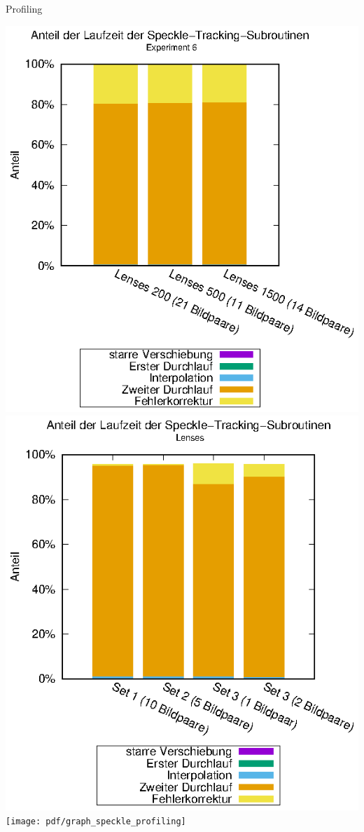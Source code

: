 \begin{frame}[allowframebreaks]{Profiling}
\begin{center}
		\hspace{-0.9cm}
		\includegraphics[width=0.47\linewidth]{pdf/speckle_exp6.eps}
		\hspace{-0.9cm}
		\includegraphics[width=0.47\linewidth]{pdf/speckle_lenses.eps}
		\hspace{-0.3cm}
		\texttt{[image: pdf/graph\_speckle\_profiling]}
		
		\framebreak
		

\end{center}
\end{frame}
